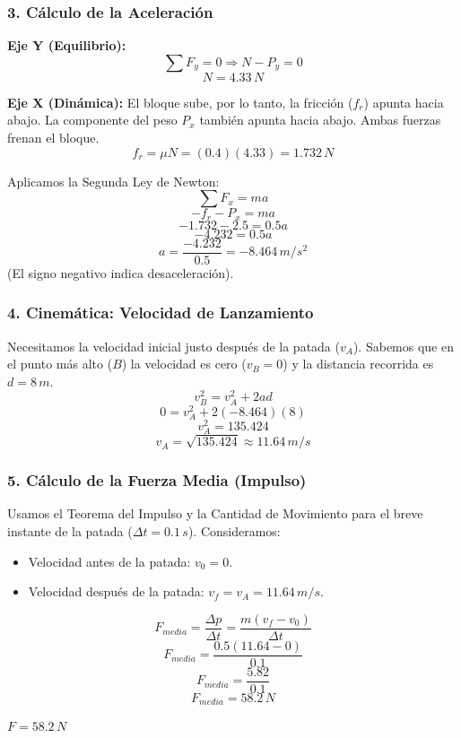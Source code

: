 \documentclass[12pt, a4paper]{article}
\begin{document}
\subsubsection*{3. Cálculo de la Aceleración}
\textbf{Eje Y (Equilibrio):}
$$ \sum F_y = 0 \Rightarrow N - P_y = 0 $$
$$ N = 4.33 \, \si{N} $$

\textbf{Eje X (Dinámica):}
El bloque sube, por lo tanto, la fricción ($f_r$) apunta hacia abajo. La componente del peso $P_x$ también apunta hacia abajo. Ambas fuerzas frenan el bloque.
$$ f_r = \mu N = (0.4)(4.33) = 1.732 \, \si{N} $$

Aplicamos la Segunda Ley de Newton:
$$ \sum F_x = m a $$
$$ -f_r - P_x = m a $$
$$ -1.732 - 2.5 = 0.5 a $$
$$ -4.232 = 0.5 a $$
$$ a = \frac{-4.232}{0.5} = -8.464 \, \si{m/s^2} $$
(El signo negativo indica desaceleración).

\subsubsection*{4. Cinemática: Velocidad de Lanzamiento}
Necesitamos la velocidad inicial justo después de la patada ($v_A$). Sabemos que en el punto más alto ($B$) la velocidad es cero ($v_B=0$) y la distancia recorrida es $d=8\,\si{m}$.
$$ v_B^2 = v_A^2 + 2 a d $$
$$ 0 = v_A^2 + 2(-8.464)(8) $$
$$ v_A^2 = 135.424 $$
$$ v_A = \sqrt{135.424} \approx 11.64 \, \si{m/s} $$

\subsubsection*{5. Cálculo de la Fuerza Media (Impulso)}
Usamos el Teorema del Impulso y la Cantidad de Movimiento para el breve instante de la patada ($\Delta t = 0.1\,\si{s}$).
Consideramos:
\begin{itemize}
    \item Velocidad antes de la patada: $v_{0} = 0$.
    \item Velocidad después de la patada: $v_f = v_A = 11.64 \, \si{m/s}$.
\end{itemize}

$$ F_{media} = \frac{\Delta p}{\Delta t} = \frac{m(v_f - v_0)}{\Delta t} $$
$$ F_{media} = \frac{0.5(11.64 - 0)}{0.1} $$
$$ F_{media} = \frac{5.82}{0.1} $$
$$ F_{media} = 58.2 \, \si{N} $$

\begin{tcolorbox}[colback=green!5!white, colframe=green!50!black, title=Respuesta Final]
\centering \Large $F = 58.2 \, \si{N}$
\end{tcolorbox}
\end{document}
